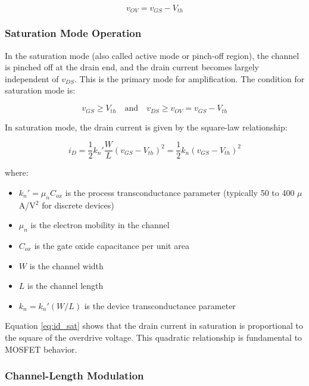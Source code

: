 \documentclass[10pt]{article}
\begin{document}
\begin{equation}
    v_{OV} = v_{GS} - V_{th}
    \label{eq:overdrive}
\end{equation}

\subsubsection{Saturation Mode Operation}

In the saturation mode (also called active mode or pinch-off region), the channel is pinched off at the drain end, and the drain current becomes largely independent of $v_{DS}$. This is the primary mode for amplification.  The condition for saturation mode is:

\begin{equation}
    v_{GS} \geq V_{th} \quad \text{and} \quad v_{DS} \geq v_{OV} = v_{GS} - V_{th}
\end{equation}

In saturation mode, the drain current is given by the square-law relationship:

\begin{equation}
    i_D = \frac{1}{2} k_n' \frac{W}{L} (v_{GS} - V_{th})^2 = \frac{1}{2} k_n (v_{GS} - V_{th})^2
    \label{eq:id_sat}
\end{equation}

where: 
\begin{itemize}
    \item $k_n' = \mu_n C_{ox}$ is the process transconductance parameter (typically 50 to 400 $\mu$A/V$^2$ for discrete devices)
    \item $\mu_n$ is the electron mobility in the channel
    \item $C_{ox}$ is the gate oxide capacitance per unit area
    \item $W$ is the channel width
    \item $L$ is the channel length
    \item $k_n = k_n' (W/L)$ is the device transconductance parameter
\end{itemize}

Equation \ref{eq:id_sat} shows that the drain current in saturation is proportional to the square of the overdrive voltage. This quadratic relationship is fundamental to MOSFET behavior. 

\subsubsection{Channel-Length Modulation}
\end{document}
